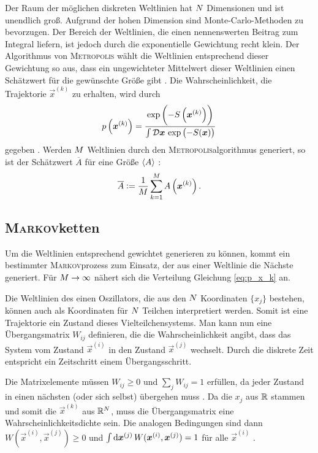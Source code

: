 Der Raum der möglichen diskreten Weltlinien hat $N$ Dimensionen und
ist unendlich groß. Aufgrund der hohen Dimension sind Monte-Carlo-Methoden zu
bevorzugen. Der Bereich der Weltlinien, die einen nennenswerten Beitrag zum
Integral liefern, ist jedoch durch die exponentielle Gewichtung recht klein.
Der Algorithmus von \textsc{Metropolis} wählt die Weltlinien entsprechend
dieser Gewichtung so aus, dass ein ungewichteter Mittelwert dieser Weltlinien
einen Schätzwert für die gewünschte Größe gibt
\parencite[434]{Creutz/Statistical_Approach_QM}. Die Wahrscheinlichkeit, die
Trajektorie $\vec x^{(k)}$ zu erhalten, wird durch
\begin{equation}
    \label{eq:p_x_k}
    p\del{\vec x^{(k)}} = \frac{\exp\del{-S\del{\vec x^{(k)}}}}{\int
        \funcmeasure
    \, \exp\del{-S(\vec x)}}
\end{equation}
gegeben \parencite[(3.6)]{Creutz/Statistical_Approach_QM}. Werden $M$
Weltlinien durch den \textsc{Metropolis}algorithmus generiert, so ist der
Schätzwert $\overline A$ für eine Größe $\langle A \rangle$
\parencite[(3.7)]{Creutz/Statistical_Approach_QM}:
\[
    \overline A := \frac1\iterations \sum_{k=1}^\iterations A\del{\vec x^{(k)}}.
\]

\subsection{\textsc{Markov}ketten}

Um die Weltlinien entsprechend gewichtet generieren zu können, kommt ein
bestimmter \textsc{Markov}prozess zum Einsatz, der aus einer Weltlinie die
Nächste generiert. Für $M \to \infty$ nähert sich die Verteilung
Gleichung \eqref{eq:p_x_k} an. \parencite[434]{Creutz/Statistical_Approach_QM}


Die Weltlinien des einen Oszillators, die aus den $N$ Koordinaten
$\{x_j\}$ bestehen, können auch als Koordinaten für $N$ Teilchen
interpretiert werden. Somit ist eine Trajektorie ein Zustand dieses
Vielteilchensystems. Man kann nun eine Übergangsmatrix $W_{ij}$ definieren, die
die Wahrscheinlichkeit angibt, dass das System vom Zustand $\vec x^{(i)}$ in
den Zustand $\vec x^{(j)}$ wechselt. Durch die diskrete Zeit entspricht ein
Zeitschritt einem Übergangsschritt.

Die Matrixelemente müssen $W_{ij} \geq 0$ und $\sum_j W_{ij} = 1$ erfüllen, da
jeder Zustand in einen nächsten (oder sich selbst) übergehen muss
\parencite[(3.8)]{Creutz/Statistical_Approach_QM}. Da die $x_j$ aus $\mathbb R$
stammen und somit die $\vec x^{(k)}$ aus $\mathbb R^N$, muss die Übergangsmatrix eine
Wahrscheinlichkeitsdichte sein. Die analogen Bedingungen sind dann $W(\vec
x^{(i)}, \vec x^{(j)}) \geq 0$ und $\int \dif \vec x^{(j)} \, W(\vec x^{(i)},
\vec x^{(j)}) = 1$ für alle $\vec x^{(i)}$
\parencite[(3.9)]{Creutz/Statistical_Approach_QM}.


